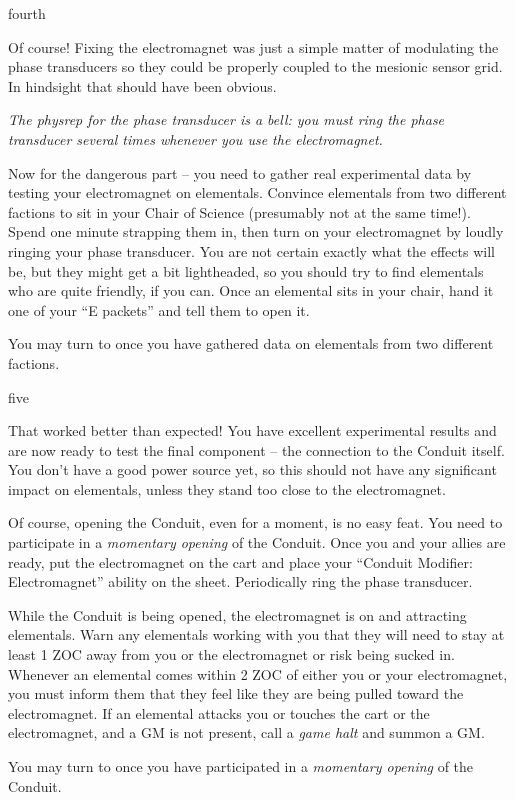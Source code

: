 \documentclass[notebook]{elementals}
\begin{document}
\begin{page}{fourth}

Of course! Fixing the electromagnet was just a simple matter of modulating the phase transducers so they could be properly coupled to the mesionic sensor grid. In hindsight that should have been obvious.

\emph{The physrep for the phase transducer is a bell: you must ring the phase transducer several times whenever you use the electromagnet.}

Now for the dangerous part -- you need to gather real experimental data by testing your electromagnet on elementals. Convince elementals from two different factions to sit in your Chair of Science (presumably not at the same time!). Spend one minute strapping them in, then turn on your electromagnet by loudly ringing your phase transducer. You are not certain exactly what the effects will be, but they might get a bit lightheaded, so you should try to find elementals who are quite friendly, if you can. Once an elemental sits in your chair, hand it one of your ``E packets'' and tell them to open it.

You may turn to  once you have gathered data on elementals from two different factions.

\end{page}

\begin{page}{five}

That worked better than expected! You have excellent experimental results and are now ready to test the final component -- the connection to the Conduit itself. You don't have a good power source yet, so this should not have any significant impact on elementals, unless they stand too close to the electromagnet.

Of course, opening the Conduit, even for a moment, is no easy feat. You need to participate in a \emph{momentary opening} of the Conduit. Once you and your allies are ready, put the electromagnet on the cart and place your ``Conduit Modifier: Electromagnet'' ability on the sheet. Periodically ring the phase transducer.

While the Conduit is being opened, the electromagnet is on and attracting elementals. Warn any elementals working with you that they will need to stay at least 1 ZOC away from you or the electromagnet or risk being sucked in. Whenever an elemental comes within 2 ZOC of either you or your electromagnet, you must inform them that they feel like they are being pulled toward the electromagnet. If an elemental attacks you or touches the cart or the electromagnet, and a GM is not present, call a \emph{game halt} and summon a GM.

You may turn to  once you have participated in a \emph{momentary opening} of the Conduit.

\end{page}
\end{document}

